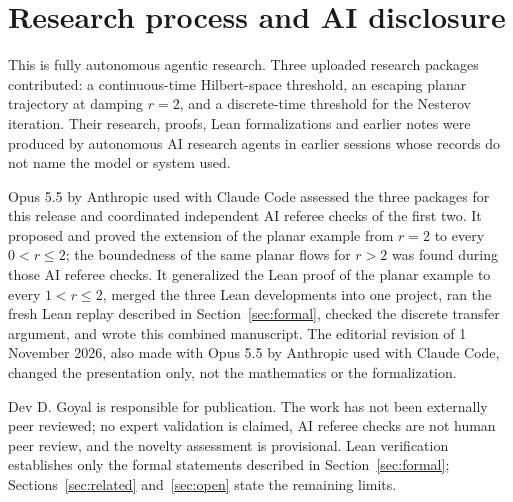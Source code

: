 \documentclass[11pt]{article}
\numberwithin{equation}{section}
\theoremstyle{definition}
\theoremstyle{remark}
\begin{document}
\section{Research process and AI disclosure}\label{sec:disclosure}
This is fully autonomous agentic research. Three uploaded research packages contributed: a continuous-time Hilbert-space threshold, an escaping planar trajectory at damping $r=2$, and a discrete-time threshold for the Nesterov iteration. Their research, proofs, Lean formalizations and earlier notes were produced by autonomous AI research agents in earlier sessions whose records do not name the model or system used.

Opus 5.5 by Anthropic used with Claude Code assessed the three packages for this release and coordinated independent AI referee checks of the first two. It proposed and proved the extension of the planar example from $r=2$ to every $0<r\le2$; the boundedness of the same planar flows for $r>2$ was found during those AI referee checks. It generalized the Lean proof of the planar example to every $1<r\le2$, merged the three Lean developments into one project, ran the fresh Lean replay described in Section~\ref{sec:formal}, checked the discrete transfer argument, and wrote this combined manuscript. The editorial revision of 1 November 2026, also made with Opus 5.5 by Anthropic used with Claude Code, changed the presentation only, not the mathematics or the formalization.

Dev D. Goyal is responsible for publication. The work has not been externally peer reviewed; no expert validation is claimed, AI referee checks are not human peer review, and the novelty assessment is provisional. Lean verification establishes only the formal statements described in Section~\ref{sec:formal}; Sections~\ref{sec:related} and~\ref{sec:open} state the remaining limits.
\end{document}
